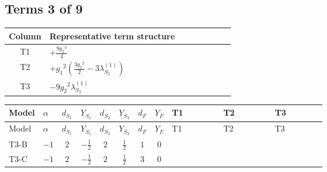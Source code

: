 \documentclass[8pt]{article}
\begin{document}
\begin{landscape}
\subsection*{Terms 3 of 9}
\begin{center}
\begin{tabular}{@{}c >{\raggedright\arraybackslash}p{0.82\linewidth}@{}}
\toprule
Column & Representative term structure \\
\midrule
T1 & \(\displaystyle +\frac{9 {g_2}^4}{4}\) \\
\midrule
T2 & \(\displaystyle +{g_1}^2 \left(\frac{3 {g_2}^2}{2}-3 {\lambda_{S_2}^{(1)}}\right)\) \\
\midrule
T3 & \(\displaystyle -9 {g_2}^2 {\lambda_{S_2}^{(1)}}\) \\
\midrule
\bottomrule
\end{tabular}
\end{center}
\smallskip
\tiny
\begin{longtable}{@{}llcccccc >{\raggedright\arraybackslash}p{0.21\linewidth} >{\raggedright\arraybackslash}p{0.21\linewidth} >{\raggedright\arraybackslash}p{0.21\linewidth}@{}}
\toprule
Model & $\alpha$ & $d_{S_1}$ & $Y_{S_1}$ & $d_{S_2}$ & $Y_{S_2}$ & $d_F$ & $Y_F$ & T1 & T2 & T3 \\
\midrule
\endfirsthead
\toprule
Model & $\alpha$ & $d_{S_1}$ & $Y_{S_1}$ & $d_{S_2}$ & $Y_{S_2}$ & $d_F$ & $Y_F$ & T1 & T2 & T3 \\
\midrule
\endhead
T3-B & $-1$ & $2$ & $-\frac{1}{2}$ & $2$ & $\frac{1}{2}$ & $1$ & $0$ & \scriptsize\adjustbox{max width=\linewidth}{$\begin{gathered} +\frac{9 {g_2}^4}{4}\end{gathered}$} & \scriptsize\adjustbox{max width=\linewidth}{$\begin{gathered} +{g_1}^2 \left(\frac{3 {g_2}^2}{2}-3 {\lambda_{S_2}^{(1)}}\right)\end{gathered}$} & \scriptsize\adjustbox{max width=\linewidth}{$\begin{gathered} -9 {g_2}^2 {\lambda_{S_2}^{(1)}}\end{gathered}$} \\
\midrule
T3-C & $-1$ & $2$ & $-\frac{1}{2}$ & $2$ & $\frac{1}{2}$ & $3$ & $0$ & \scriptsize\adjustbox{max width=\linewidth}{$\begin{gathered} +\frac{9 {g_2}^4}{4}\end{gathered}$} & \scriptsize\adjustbox{max width=\linewidth}{$\begin{gathered} +{g_1}^2 \left(\frac{3 {g_2}^2}{2}-3 {\lambda_{S_2}^{(1)}}\right)\end{gathered}$} & \scriptsize\adjustbox{max width=\linewidth}{$\begin{gathered} -9 {g_2}^2 {\lambda_{S_2}^{(1)}}\end{gathered}$} \\

\end{longtable}
\end{landscape}
\end{document}
